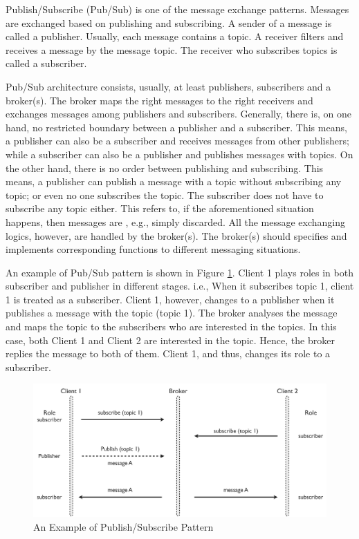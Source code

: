 Publish/Subscribe (Pub/Sub) is one of the message exchange patterns. Messages are exchanged based on publishing and subscribing. A sender of a message is called a publisher. Usually, each message contains a topic. A receiver filters and receives a message by the message topic. The receiver who subscribes topics is called a subscriber. 

Pub/Sub architecture consists, usually, at least publishers, subscribers and a broker(s). The broker maps the right messages to the right receivers and exchanges messages among publishers and subscribers. Generally, there is, on one hand, no restricted boundary between a publisher and a subscriber. This means, a publisher can also be a subscriber and receives messages from other publishers; while a subscriber can also be a publisher and publishes messages with topics. On the other hand, there is no order between publishing and subscribing. This means, a publisher can publish a message with a topic without subscribing any topic; or even no one subscribes the topic. The subscriber does not have to subscribe any topic either. This refers to, if the aforementioned situation happens, then messages are , e.g., simply discarded. All the message exchanging logics, however, are handled by the broker(s). The broker(s) should specifies and implements corresponding functions to different messaging situations. 

An example of Pub/Sub pattern is shown in Figure \ref{fig:publish-subscribe-pattern}. Client 1 plays roles in both subscriber and publisher in different stages. i.e., When it subscribes topic 1, client 1 is treated as a subscriber. Client 1, however, changes to a publisher when it publishes a message with the topic (topic 1). The broker analyses the message and maps the topic to the subscribers who are interested in the topics. In this case, both Client 1 and Client 2 are interested in the topic. Hence, the broker replies the message to both of them. Client 1, and thus, changes its role to a subscriber.

\begin{figure}[ht]
  \begin{center}
    \includegraphics[width=1\textwidth]{images/publish-subscribe-pattern.pdf}
    \caption{An Example of Publish/Subscribe Pattern}
    \label{fig:publish-subscribe-pattern}
  \end{center}
\end{figure}


